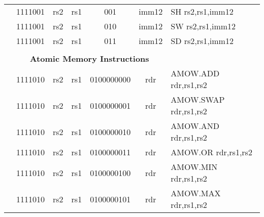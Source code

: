 \begin{table}[p]
\begin{small}
\begin{center}
\begin{tabular}{rcccccccccl}
&
\multicolumn{2}{|c|}{1111001} &
\multicolumn{1}{c|}{rs2} &
\multicolumn{1}{c|}{rs1} &
\multicolumn{1}{c|}{001} &
\multicolumn{4}{c|}{imm12} & SH rs2,rs1,imm12 \\
\cline{2-10}
  

&
\multicolumn{2}{|c|}{1111001} &
\multicolumn{1}{c|}{rs2} &
\multicolumn{1}{c|}{rs1} &
\multicolumn{1}{c|}{010} &
\multicolumn{4}{c|}{imm12} & SW rs2,rs1,imm12 \\
\cline{2-10}
  

&
\multicolumn{2}{|c|}{1111001} &
\multicolumn{1}{c|}{rs2} &
\multicolumn{1}{c|}{rs1} &
\multicolumn{1}{c|}{011} &
\multicolumn{4}{c|}{imm12} & SD rs2,rs1,imm12 \\
\cline{2-10}
  

&
\multicolumn{9}{c}{} & \\
&
\multicolumn{9}{c}{\bf Atomic Memory Instructions} & \\
\cline{2-10}
  

&
\multicolumn{2}{|c|}{1111010} &
\multicolumn{1}{c|}{rs2} &
\multicolumn{1}{c|}{rs1} &
\multicolumn{4}{c|}{0100000000} &
\multicolumn{1}{c|}{rdr} & AMOW.ADD rdr,rs1,rs2 \\
\cline{2-10}
  

&
\multicolumn{2}{|c|}{1111010} &
\multicolumn{1}{c|}{rs2} &
\multicolumn{1}{c|}{rs1} &
\multicolumn{4}{c|}{0100000001} &
\multicolumn{1}{c|}{rdr} & AMOW.SWAP rdr,rs1,rs2 \\
\cline{2-10}
  

&
\multicolumn{2}{|c|}{1111010} &
\multicolumn{1}{c|}{rs2} &
\multicolumn{1}{c|}{rs1} &
\multicolumn{4}{c|}{0100000010} &
\multicolumn{1}{c|}{rdr} & AMOW.AND rdr,rs1,rs2 \\
\cline{2-10}
  

&
\multicolumn{2}{|c|}{1111010} &
\multicolumn{1}{c|}{rs2} &
\multicolumn{1}{c|}{rs1} &
\multicolumn{4}{c|}{0100000011} &
\multicolumn{1}{c|}{rdr} & AMOW.OR rdr,rs1,rs2 \\
\cline{2-10}
  

&
\multicolumn{2}{|c|}{1111010} &
\multicolumn{1}{c|}{rs2} &
\multicolumn{1}{c|}{rs1} &
\multicolumn{4}{c|}{0100000100} &
\multicolumn{1}{c|}{rdr} & AMOW.MIN rdr,rs1,rs2 \\
\cline{2-10}
  

&
\multicolumn{2}{|c|}{1111010} &
\multicolumn{1}{c|}{rs2} &
\multicolumn{1}{c|}{rs1} &
\multicolumn{4}{c|}{0100000101} &
\multicolumn{1}{c|}{rdr} & AMOW.MAX rdr,rs1,rs2 \\
\cline{2-10}
  


\end{tabular}
\end{center}
\end{small}
\end{table}
